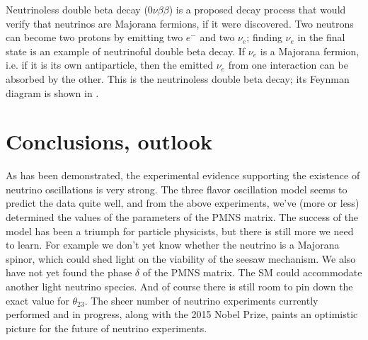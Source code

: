 Neutrinoless double beta decay ($0\nu\beta\beta$) is a proposed decay
process that would verify that neutrinos are Majorana fermions, if
it were discovered. Two neutrons can become two protons by emitting
two $e^-$ and two $\nu_e$; finding $\nu_e$ in the final state is
an example of neutrinoful double beta decay. If $\nu_e$ is a
Majorana fermion, i.e. if it is its own antiparticle, then the
emitted $\nu_e$ from one interaction can be absorbed by the other.
This is the neutrinoless double beta decay; its Feynman diagram
is shown in .


\section{Conclusions, outlook}
As has been demonstrated, the experimental evidence supporting the existence of
neutrino oscillations is very strong. The three flavor oscillation model seems
to predict the data quite well, and from the above experiments, we've (more or
less) determined the values of the parameters of the PMNS matrix.
The success of the model has been a triumph for particle
physicists, but there is still more we need to learn. For example we don't yet
know whether the neutrino is a Majorana spinor, which could shed light on the
viability of the seesaw mechanism. We also have not yet found the
phase $\delta$ of the PMNS matrix. The SM could accommodate another light
neutrino species. And of course there is still room to pin down the exact
value for $\theta_{23}$. The sheer number of neutrino experiments currently
performed and in progress, along with the 2015 Nobel Prize, paints an
optimistic picture for the future of neutrino experiments.



